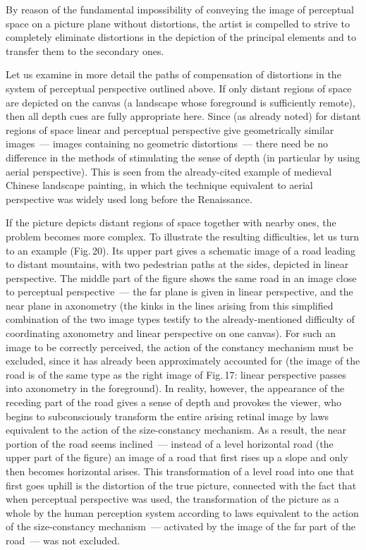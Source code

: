 
By reason of the fundamental impossibility of conveying the image of perceptual space
on a picture plane without distortions, the artist is compelled to strive to completely
eliminate distortions in the depiction of the principal elements and to transfer them to
the secondary ones.

Let us examine in more detail the paths of compensation of distortions in the system of
perceptual perspective outlined above.  If only distant regions of space are depicted on
the canvas (a landscape whose foreground is sufficiently remote), then all depth cues are
fully appropriate here.  Since (as already noted) for distant regions of space linear and
perceptual perspective give geometrically similar images~--- images containing no
geometric distortions~--- there need be no difference in the methods of stimulating the
sense of depth (in particular by using aerial perspective).  This is seen from the
already-cited example of medieval Chinese landscape painting, in which the technique
equivalent to aerial perspective was widely used long before the Renaissance.

If the picture depicts distant regions of space together with nearby ones, the problem
becomes more complex.  To illustrate the resulting difficulties, let us turn to an example
(Fig.\,20).  Its upper part gives a schematic image of a road leading to distant mountains,
with two pedestrian paths at the sides, depicted in linear perspective.  The middle part
of the figure shows the same road in an image close to perceptual perspective~---
the far plane is given in linear perspective, and the near plane in axonometry (the kinks
in the lines arising from this simplified combination of the two image types testify to the
already-mentioned difficulty of coordinating axonometry and linear perspective on one
canvas).  For such an image to be correctly perceived, the action of the constancy
mechanism must be excluded, since it has already been approximately accounted for
(the image of the road is of the same type as the right image of Fig.\,17: linear
perspective passes into axonometry in the foreground).  In reality, however, the
appearance of the receding part of the road gives a sense of depth and provokes the
viewer, who begins to subconsciously transform the entire arising retinal image by laws
equivalent to the action of the size-constancy mechanism.  As a result, the near portion
of the road seems inclined~--- instead of a level horizontal road (the upper part of the
figure) an image of a road that first rises up a slope and only then becomes horizontal
arises.  This transformation of a level road into one that first goes uphill is the
distortion of the true picture, connected with the fact that when perceptual perspective
was used, the transformation of the picture as a whole by the human perception system
according to laws equivalent to the action of the size-constancy mechanism~--- activated
by the image of the far part of the road~--- was not excluded.

